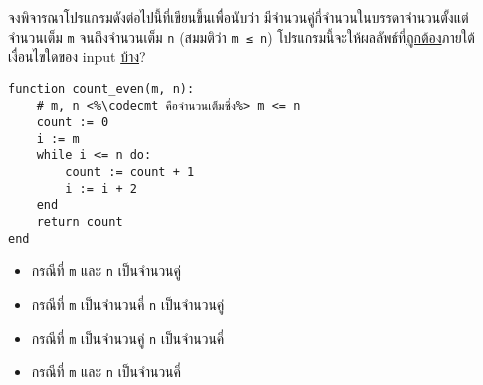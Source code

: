 \question{}

จงพิจารณาโปรแกรมดังต่อไปนี้ที่เขียนขึ้นเพื่อนับว่า 
มีจำนวนคู่กี่จำนวนในบรรดาจำนวนตั้งแต่จำนวนเต็ม \lstinline{m} จนถึงจำนวนเต็ม \lstinline{n} (สมมติว่า \verb|m ≤ n|)\;
โปรแกรมนี้จะให้ผลลัพธ์ที่\uline{ถูกต้อง}ภายใต้เงื่อนไขใดของ input \uline{บ้าง}?
\begin{lstlisting}
function count_even(m, n):
    # m, n <%\codecmt คือจำนวนเต็มซึ่ง%> m <= n
    count := 0
    i := m
    while i <= n do:
        count := count + 1
        i := i + 2
    end
    return count
end
\end{lstlisting}

\begin{multicols}{2}
\begin{itemize}[label={$\square$}]
    \item กรณีที่ \verb|m| และ \verb|n| เป็นจำนวนคู่
    \item กรณีที่ \verb|m| เป็นจำนวนคี่ \verb|n| เป็นจำนวนคู่
    \item กรณีที่ \verb|m| เป็นจำนวนคู่ \verb|n| เป็นจำนวนคี่
    \item กรณีที่ \verb|m| และ \verb|n| เป็นจำนวนคี่
\end{itemize}
\end{multicols}